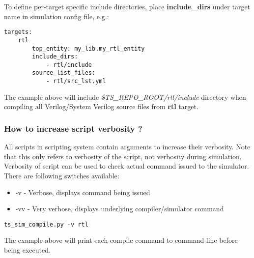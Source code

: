 \documentclass{tropic_design_spec}
\begin{document}

To define per-target specific include directories, place \textbf{include_dirs} under
target name in simulation config file, e.g.:

\begin{lstlisting}
targets:
    rtl
        top_entity: my_lib.my_rtl_entity
        include_dirs:
            - rtl/include
        source_list_files:
            - rtl/src_lst.yml
\end{lstlisting}

The example above will include \textit{\$TS_REPO_ROOT/rtl/include} directory when
compiling all Verilog/System Verilog source files from \textbf{rtl} target.


\subsubsection{How to increase script verbosity ?}
\label{sec:how-to-increase-script-verbosity}

All scripts in scripting system contain arguments to increase their verbosity. Note that
this only refers to verbosity of the script, not verbosity during simulation. Verbosity
of script can be used to check actual command issued to the simulator.
There are following switches available:
\begin{itemize}
    \item{-v   - Verbose, displays command being issued}
    \item{-vv  - Very verbose, displays underlying compiler/simulator command}
\end{itemize}

\begin{lstlisting}
ts_sim_compile.py -v rtl
\end{lstlisting}

The example above will print each compile command to command line before being executed.


\end{document}
